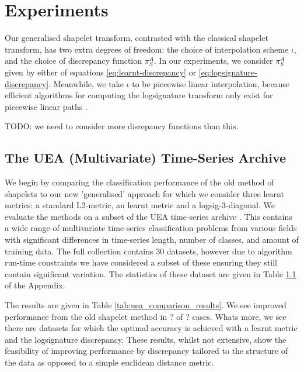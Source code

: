 \section{Experiments}
Our generalised shapelet transform, contrasted with the classical shapelet transform, has two extra degrees of freedom: the choice of interpolation scheme $\iota$, and the choice of discrepancy function $\pi^A_S$. In our experiments, we consider $\pi^A_S$ given by either of equations \eqref{eq:learnt-discrepancy} or \eqref{eq:logsignature-discrepancy}. Meanwhile, we take $\iota$ to be piecewise linear interpolation, because efficient algorithms for computing the logsignature transform only exist for piecewise linear paths \cite{signatory}.

TODO: we need to consider more disrepancy functions than this.


\subsection{The UEA (Multivariate) Time-Series Archive}
We begin by comparing the classification performance of the old method of shapelets to our new 'generalised' approach for which we consider three learnt metrics: a standard L2-metric, an learnt metric and a logsig-3-diagonal. We evaluate the methods on a subset of the UEA time-series archive \cite{bagnall2018uea}. This contains a wide range of multivariate time-series classification problems from various fields with significant differences in time-series length, number of classes, and amount of training data. The full collection contains 30 datasets, however due to algorithm run-time constraints we have considered a subset of these ensuring they still contain significant variation. The statistics of these dataset are given in Table \ref{} of the Appendix.

The results are given in Table \ref{tab:uea_comparison_results}. We see improved performance from the old shapelet method in ? of ? cases. Whats more, we see there are datasets for which the optimal accuracy is achieved with a learnt metric and the logsignature discrepancy. These results, whilst not extensive, show the feasibility of improving performance by discrepancy tailored to the structure of the data as opposed to a simple euclidean distance metric.
\begin{table}[ht]
    \centering
    \caption{}
    \label{tab:uea_comparison_results}
    
\end{table}


